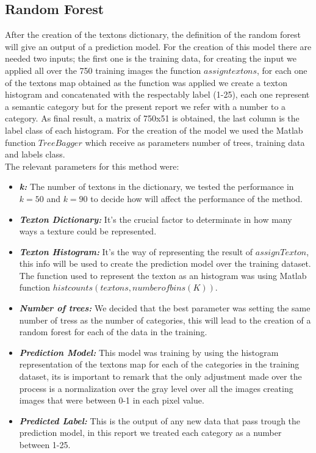 \documentclass[10pt,twocolumn,letterpaper]{article}
\begin{document}
\subsection{Random Forest}
After the creation of the textons dictionary, the definition of the random forest will give an output of a prediction model. For the creation of this model there are needed two inputs; the first one is the training data, for creating the input we applied all over the 750 training images the function $assigntextons$, for each one of the textons map obtained as the function was applied we create a texton histogram and concatenated with the respectably label (1-25), each one represent a semantic category but for the present report we refer with a number to a category. As final result, a matrix of 750x51 is obtained, the last column is the label class of each histogram.
For the creation of the model we used the Matlab function $TreeBagger$ which receive as parameters number of trees, training data and labels class.\\
The relevant parameters for this method were:
\begin{itemize}
\item  \textit{\textbf{k:}} The number of textons in the dictionary, we tested the performance in $k=50$ and $k=90$ to decide how will affect the performance of the method.
\item  \textit{\textbf{Texton Dictionary:}} It's the crucial factor to determinate in how many ways a texture could be represented.
\item  \textit{\textbf{Texton Histogram:}} It's the way of representing the result of $assignTexton$, this info will be used to create the prediction model over the training dataset. The function used to represent the texton as an histogram was using Matlab function $histcounts(textons,number of bins(K))$.
\item  \textit{\textbf{Number of trees:}} We decided that the best parameter was setting the same number of tress as the  number of categories, this will lead to the creation of a random forest for each of the data in the training.
\item  \textit{\textbf{Prediction Model:}} This model was training by using the histogram representation of the textons map for each of the categories in the training dataset, its is important to remark that the only adjustment made over the process is a normalization over the gray level over all the images creating images that were between 0-1 in each pixel value.
\item  \textit{\textbf{Predicted Label:}} This is the output of any new data that pass trough the prediction model, in this report we treated each category as a number between 1-25.
\end{itemize}
\end{document}

